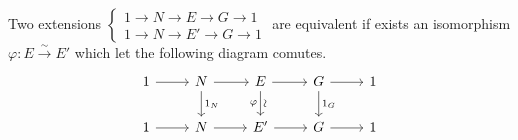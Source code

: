 \begin{definition}
  Two extensions $\begin{cases}
    1\to N\to E\to G\to 1 \\
    1\to N\to E'\to G\to 1
  \end{cases}$
  are equivalent if exists an isomorphism $\varphi: E \xrightarrow{\sim} E'$ which let the
  following diagram comutes.
  \[
    \begin{tikzcd}
      1 \arrow[r]
      & N \arrow[d, "1_N"] \arrow[r]
      & E \arrow[d, "\rotatebox{90}{\(\sim\)}", "\varphi"'] \arrow[r]
      & G \arrow[d, "1_G"] \arrow[r]
      & 1 \\
      1 \arrow[r] & N \arrow[r] & E' \arrow[r] & G \arrow[r] & 1
    \end{tikzcd}
  \]
\end{definition}

